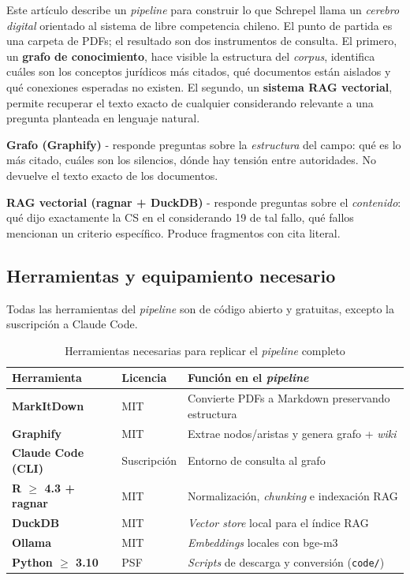 \documentclass[12pt,a4paper]{article}
\begin{document}
Este artículo describe un \textit{pipeline} para construir lo que Schrepel llama un
\emph{cerebro digital} orientado al sistema de libre competencia chileno. El punto de
partida es una carpeta de PDFs; el resultado son dos instrumentos de consulta.
El primero, un \textbf{grafo de conocimiento}, hace visible la estructura del
\textit{corpus}, identifica cuáles son los conceptos jurídicos más citados, qué documentos
están aislados y qué conexiones esperadas no existen. El segundo, un \textbf{sistema
RAG vectorial}, permite recuperar el texto exacto de cualquier considerando
relevante a una pregunta planteada en lenguaje natural.

\begin{keybox}
\textbf{Grafo (Graphify)} - responde preguntas sobre la \emph{estructura} del
campo: qué es lo más citado, cuáles son los silencios, dónde hay tensión entre
autoridades. No devuelve el texto exacto de los documentos.

\medskip
\textbf{RAG vectorial (ragnar + DuckDB)} - responde preguntas sobre el
\emph{contenido}: qué dijo exactamente la CS en el considerando 19 de tal fallo,
qué fallos mencionan un criterio específico. Produce fragmentos con cita literal.
\end{keybox}

\subsection{Herramientas y equipamiento necesario}

Todas las herramientas del \textit{pipeline} son de código abierto y gratuitas,
excepto la suscripción a Claude Code.

\begin{table}[htbp]
\centering
\caption{Herramientas necesarias para replicar el \textit{pipeline} completo}
\label{tab:herramientas}
\small
\begin{tabularx}{\linewidth}{>{\bfseries}p{3.4cm} l X}
\toprule
\rowcolor{tabhead}\color{black}\textbf{Herramienta} &
  \color{black}\textbf{Licencia} &
  \color{black}\textbf{Función en el \textit{pipeline}} \\
\midrule
MarkItDown & MIT & Convierte PDFs a Markdown preservando estructura \\
\addlinespace
Graphify & MIT & Extrae nodos/aristas y genera grafo + \textit{wiki} \\
\addlinespace
Claude Code (CLI) & Suscripción & Entorno de consulta al grafo \\
\addlinespace
R $\geq$ 4.3 + ragnar & MIT & Normalización, \textit{chunking} e indexación RAG \\
\addlinespace
DuckDB & MIT & \textit{Vector store} local para el índice RAG \\
\addlinespace
Ollama & MIT & \textit{Embeddings} locales con bge-m3 \\
\addlinespace
Python $\geq$ 3.10 & PSF & \textit{Scripts} de descarga y conversión (\texttt{code/}) \\
\bottomrule
\end{tabularx}
\end{table}
\end{document}
